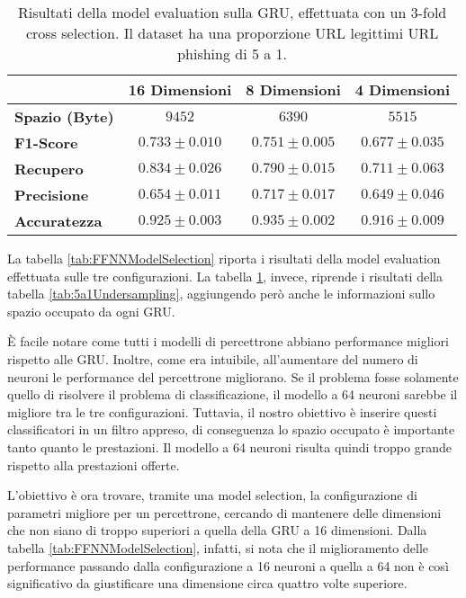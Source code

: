 \documentclass[../../main.tex]{subfiles}
\begin{document}
    \begin{table}[H]
        \centering
        \begin{tabular}{lccc}
            \toprule
            {} &                      \textbf{16 Dimensioni} & \textbf{8 Dimensioni} & \textbf{4 Dimensioni} \\
            \midrule
            \textbf{Spazio (Byte)}  &      $9452$ & $6390$ & $5515$\\
            \midrule               
            \textbf{F1-Score }      &      $0.733 \pm 0.010$ & $0.751 \pm 0.005$ & $0.677 \pm 0.035$\\
            \textbf{Recupero   }    &      $0.834 \pm 0.026$ & $0.790 \pm 0.015$ & $0.711 \pm 0.063$\\
            \textbf{Precisione}     &      $0.654 \pm 0.011$ & $0.717 \pm 0.017$ & $0.649 \pm 0.046$\\
            \textbf{Accuratezza }   &      $0.925 \pm 0.003$ & $0.935 \pm 0.002$ & $0.916 \pm 0.009$\\
            \bottomrule
        \end{tabular}
        \caption{Risultati della model evaluation sulla GRU, effettuata con un 3-fold cross selection. Il dataset ha una proporzione URL legittimi URL phishing di 5 a 1.}
        \label{tab:GRUModelSelection}
    \end{table}

    La tabella \ref{tab:FFNNModelSelection} riporta i risultati della model evaluation effettuata sulle tre configurazioni. La tabella \ref{tab:GRUModelSelection}, invece, riprende i risultati della tabella \ref{tab:5a1Undersampling}, aggiungendo però anche le informazioni sullo spazio occupato da ogni GRU.

    È facile notare come tutti i modelli di percettrone abbiano performance migliori rispetto alle GRU. Inoltre, come era intuibile, all'aumentare del numero di neuroni le performance del percettrone migliorano. Se il problema fosse solamente quello di risolvere il problema di classificazione, il modello a 64 neuroni sarebbe il migliore tra le tre configurazioni. Tuttavia, il nostro obiettivo è inserire questi classificatori in un filtro appreso, di conseguenza lo spazio occupato è importante tanto quanto le prestazioni. Il modello a 64 neuroni risulta quindi troppo grande rispetto alla prestazioni offerte.
    
    L'obiettivo è ora trovare, tramite una model selection, la configurazione di parametri migliore per un percettrone, cercando di mantenere delle dimensioni che non siano di troppo superiori a quella della GRU a 16 dimensioni. Dalla tabella \ref{tab:FFNNModelSelection}, infatti, si nota che il miglioramento delle performance passando dalla configurazione a 16 neuroni a quella a 64 non è così significativo da giustificare una dimensione circa quattro volte superiore.
\end{document}
